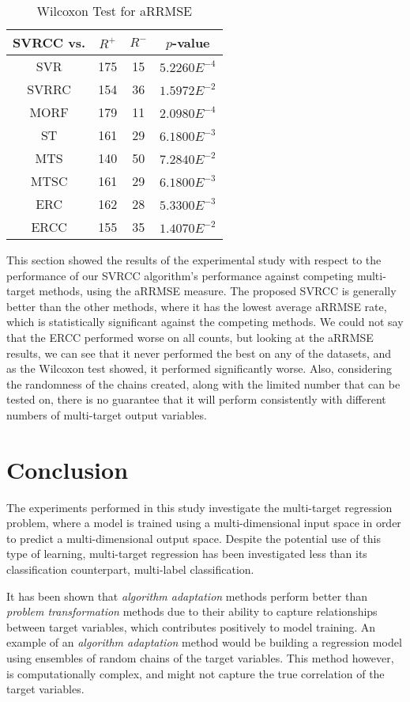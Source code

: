 \documentclass[preprint,12pt]{elsarticle}
\begin{document}
\begin{table}
\renewcommand{\arraystretch}{1.2}
\centering
\caption{Wilcoxon Test for aRRMSE}
\label{tab:Wilcoxon}
\begin{tabular}{cccc}
SVRCC vs. & $R^{+}$ & $R^{-}$ & $p$-value\\ 
\hline 
SVR & 175 & 15 & $5.2260E^{-4}$\\  
SVRRC & 154 & 36 & $1.5972E^{-2}$\\  
MORF & 179 & 11 & $2.0980E^{-4}$\\  
ST & 161 & 29 & $6.1800E^{-3}$\\  
MTS & 140 & 50 & $7.2840E^{-2}$\\  
MTSC & 161 & 29 & $6.1800E^{-3}$\\
ERC & 162 & 28 & $5.3300E^{-3}$\\
ERCC & 155 & 35 & $1.4070E^{-2}$\\ 
\hline 
\end{tabular}
\end{table}

This section showed the results of the experimental study with respect to the performance of our SVRCC algorithm's performance against competing multi-target methods, using the aRRMSE measure. The proposed SVRCC is generally better than the other methods, where it has the lowest average aRRMSE rate, which is statistically significant against the competing methods. We could not say that the ERCC performed worse on all counts, but looking at the aRRMSE results, we can see that it never performed the best on any of the datasets, and as the Wilcoxon test showed, it performed significantly worse. Also, considering the randomness of the chains created, along with the limited number that can be tested on, there is no guarantee that it will perform consistently with different numbers of multi-target output variables.

\section{Conclusion}\label{sec:conclusions}
The experiments performed in this study investigate the multi-target regression problem, where a model is trained using a multi-dimensional input space in order to predict a multi-dimensional output space. Despite the potential use of this type of learning, multi-target regression has been investigated less than its classification counterpart, multi-label classification. 

It has been shown that \textit{algorithm adaptation} methods perform better than \textit{problem transformation} methods due to their ability to capture relationships between target variables, which contributes positively to model training. An example of an \textit{algorithm adaptation} method would be building a regression model using ensembles of random chains of the target variables. This method however, is computationally complex, and might not capture the true correlation of the target variables.
\end{document}
